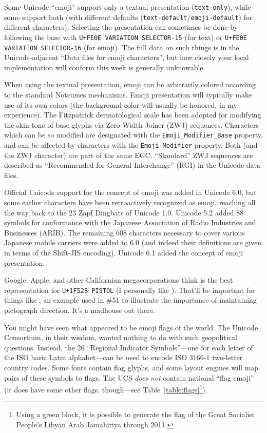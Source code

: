 Some Unicode ``emoji'' support only a textual presentation (\texttt{text-only}),
while some support both (with different defaults
(\texttt{text-default}/\texttt{emoji-default}) for different characters).
Selecting the presentation can sometimes be done by following the base with
\texttt{U+FE0E VARIATION SELECTOR-15} (for text) or \texttt{U+FE0E VARIATION
SELECTOR-16} (for emoji). The full data on such things is in the
Unicode-adjacent ``Data files for emoji characters'', but how closely your
local implementation will conform this week is generally unknowable.

When using the textual presentation, emoji can be arbitrarily colored according
to the standard Notcurses mechanisms. Emoji presentation will typically make use
of its own colors (the background color will usually be honored, in my
experience). The Fitzpatrick dermatological scale has been adopted for modifying
the skin tone of base glyphs via Zero-Width-Joiner (ZWJ) sequences. Characters
which can be so modified are designated with the \texttt{Emoji\_Modifier\_Base}
property, and can be affected by characters with the \texttt{Emoji\_Modifier}
property. Both (and the ZWJ character) are part of the same EGC. ``Standard'' ZWJ
sequences are described as ``Recommended for General Interchange'' (RGI) in
the Unicode data files.

Official Unicode support for the concept of emoji was added in Unicode 6.0, but
some earlier characters have been retroactively recognized as emoji, reaching
all the way back to the 23 Zapf Dingbats of Unicode 1.0. Unicode 5.2 added
88 symbols for conformance with the Japanese Association of Radio
Industries and Businesses (ARIB). The remaining 608 characters necessary to
cover various Japanese mobile carriers were added to 6.0 (and indeed their
definitions are given in terms of the Shift-JIS encoding\cite{emojiversions}).
Unicode 6.1 added the concept of emoji presentation.

Google, Apple, and other Californian megacorporations think
 is the best representation for
 \texttt{U+1F52B PISTOL} (I personally like
). That'll be important for things like
{}, an example used in \#51 to illustrate the
importance of maintaining pictograph direction. It's a madhouse out there.

You might have seen what appeared to be emoji flags of the world. The Unicode
Consortium, in their wisdom, wanted nothing to do with such geopolitical
questions. Instead, the 26 ``Regional Indicator Symbols''---one for each
letter of the ISO basic Latin alphabet\cite{iso646}---can be used to encode
ISO 3166-1\cite{iso3166} two-letter country codes\cite{darkcorners}. Some fonts contain flag
glyphs, and some layout engines will map pairs of these symbols to flags. The
UCS \textit{does not} contain national ``flag emoji'' (it does have some other
flags, though---see Table~\ref{table:flags}\footnote{Using a green block,
it is possible to generate the flag of the Great Socialist People's Libyan Arab Jamahiriya through 2011.}).

